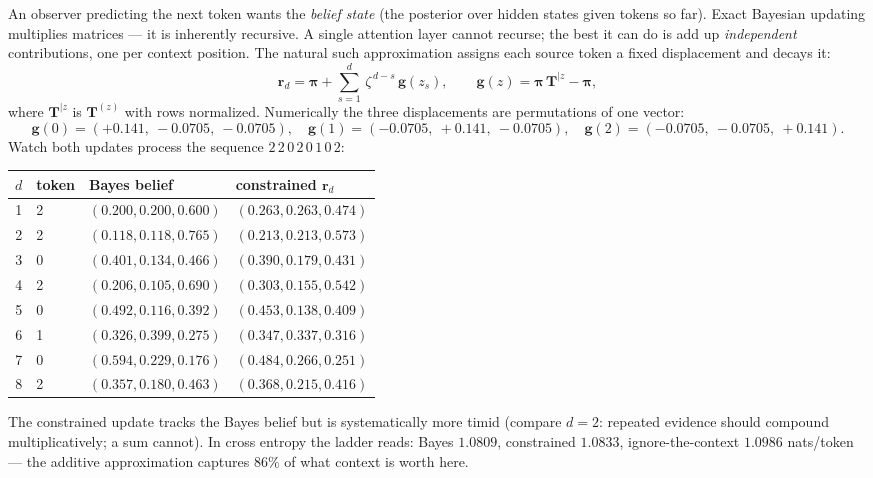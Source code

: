 \documentclass{article}
\newcommand{\pib}{\boldsymbol{\pi}}
\newcommand{\gb}{\boldsymbol{g}}
\newcommand{\rb}{\boldsymbol{r}}
\newcommand{\Tb}{\boldsymbol{T}}
\newcommand{\Tz}[1]{\Tb^{(#1)}}
\newcommand{\Tcond}[1]{\Tb^{|#1}}
\begin{document}
An observer predicting the next token wants the \emph{belief state} (the
posterior over hidden states given tokens so far). Exact Bayesian updating
multiplies matrices --- it is inherently recursive. A single attention layer
cannot recurse; the best it can do is add up \emph{independent} contributions,
one per context position. The natural such approximation assigns each source
token a fixed displacement and decays it:
\begin{equation}\label{constrained}
\rb_d = \pib + \sum_{s=1}^{d}\, \zeta^{\,d-s}\, \gb(z_s),
\qquad
\gb(z) = \pib\,\Tcond{z} - \pib,
\end{equation}
where $\Tcond{z}$ is $\Tz{z}$ with rows normalized. Numerically the three
displacements are permutations of one vector:
\begin{equation*}
\gb(0) = (+0.141,\ -0.0705,\ -0.0705),\quad
\gb(1) = (-0.0705,\ +0.141,\ -0.0705),\quad
\gb(2) = (-0.0705,\ -0.0705,\ +0.141).
\end{equation*}
Watch both updates process the sequence $2\,2\,0\,2\,0\,1\,0\,2$:

\begin{center}
\begin{tabular}{clll}
\toprule
$d$ & token & Bayes belief & constrained $\rb_d$ \\
\midrule
1 & 2 & $(0.200, 0.200, 0.600)$ & $(0.263, 0.263, 0.474)$\\
2 & 2 & $(0.118, 0.118, 0.765)$ & $(0.213, 0.213, 0.573)$\\
3 & 0 & $(0.401, 0.134, 0.466)$ & $(0.390, 0.179, 0.431)$\\
4 & 2 & $(0.206, 0.105, 0.690)$ & $(0.303, 0.155, 0.542)$\\
5 & 0 & $(0.492, 0.116, 0.392)$ & $(0.453, 0.138, 0.409)$\\
6 & 1 & $(0.326, 0.399, 0.275)$ & $(0.347, 0.337, 0.316)$\\
7 & 0 & $(0.594, 0.229, 0.176)$ & $(0.484, 0.266, 0.251)$\\
8 & 2 & $(0.357, 0.180, 0.463)$ & $(0.368, 0.215, 0.416)$\\
\bottomrule
\end{tabular}
\end{center}

The constrained update tracks the Bayes belief but is systematically more
timid (compare $d = 2$: repeated evidence should compound multiplicatively;
a sum cannot). In cross entropy the ladder reads: Bayes $1.0809$,
constrained $1.0833$, ignore-the-context $1.0986$ nats/token --- the additive
approximation captures $86\%$ of what context is worth here.
\end{document}
